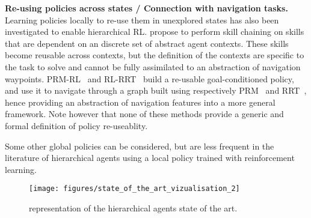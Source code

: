 \textbf{Re-using policies across states / Connection with navigation tasks.}
Learning policies locally to re-use them in unexplored states has also been investigated to enable hierarchical RL.
\citet{konidaris2007building} propose to perform skill chaining on skills that are dependent on an discrete set of
abstract agent contexts.
These skills become reusable across contexts, but the definition of the contexts are specific to the task to solve and
cannot be fully assimilated to an abstraction of navigation waypoints.
PRM-RL~\citep{faust2018prm} and RL-RRT~\citep{chiang2019rl} build a re-usable goal-conditioned policy, and use it to
navigate through a graph built using respectively PRM~\citep{kavraki1996probabilistic} and
RRT~\citep{lavalle1998rapidly}, hence providing an abstraction of navigation features into a more general framework.
Note however that none of these methods provide a generic and formal definition of policy re-useablity.

Some other global policies can be considered, but are less frequent in the literature of hierarchical agents using a 
local policy trained with reinforcement learning.


\begin{figure}%
  \centering
  \texttt{[image: figures/state\_of\_the\_art\_vizualisation\_2]}
  \caption{representation of the hierarchical agents state of the art.}
  \label{figure:stateOfTheArt:vizualisation}
\end{figure}

